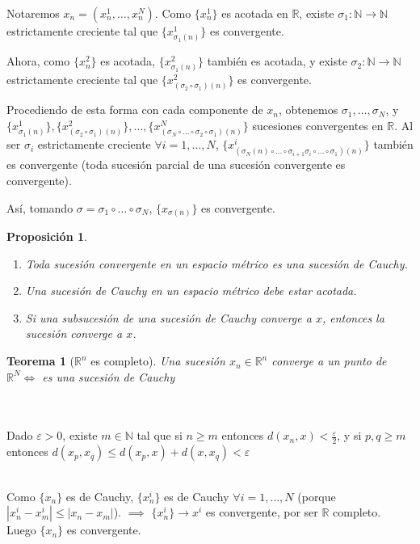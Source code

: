 \documentclass[11pt, a4paper]{article}
\makeatletter
\renewenvironment{proof}[1][\proofname] {\vspace{-15pt}\par\pushQED{\qed}\normalfont\topsep6\p@\@plus6\p@\relax\trivlist\item[\hskip\labelsep\it#1\@addpunct{.}]\ignorespaces}{\popQED\endtrivlist\@endpefalse}
\theoremstyle{theorem-style}
\newtheorem*{nth}{Teorema}
\newtheorem*{nprop}{Proposición}
\theoremstyle{definition-style}
\theoremstyle{remark-style}
\theoremstyle{example-style}
\newenvironment{nlist}
{\begin{enumerate}
\renewcommand\labelenumi{(\emph{\roman{enumi})}}}
{\end{enumerate}}
\makeatother
\begin{document}
\begin{proof}
	Notaremos $x_n = (x_n^1, \dots, x_n^N)$. Como $\{x_n^1\}$ es acotada en $\mathbb{R}$, existe $\sigma_1 : \mathbb{N} \rightarrow \mathbb{N}$ estrictamente creciente tal que $\{x_{\sigma_1(n)}^1\}$ es convergente.

Ahora, como $\{x_n^2\}$ es acotada, $\{x_{\sigma_1(n)}^2\}$ también es acotada, y existe $\sigma_2 : \mathbb{N} \rightarrow \mathbb{N}$ estrictamente creciente tal que $\{x_{(\sigma_2\circ\sigma_1)(n)}^2\}$ es convergente.

Procediendo de esta forma con cada componente de $x_n$, obtenemos $\sigma_1, \dots, \sigma_N$, y\\ $\{x_{\sigma_1(n)}^1\}, \{x_{(\sigma_2\circ\sigma_1)(n)}^2\}, \dots, \{x_{(\sigma_N\circ\dots\circ\sigma_2\circ\sigma_1)(n)}^N\}$ sucesiones convergentes en $\mathbb{R}$. Al ser $\sigma_i$ estrictamente creciente $\forall i=1,\dots,N$, $\{x_{(\sigma_N(n)\circ\dots\circ\sigma_{i+1}\sigma_i\circ\dots\circ\sigma_1)(n)}^i\}$ también es convergente (toda sucesión parcial de una sucesión convergente es convergente).

Así, tomando $\sigma = \sigma_1\circ\dots\circ\sigma_N$, $\{x_{\sigma(n)}\}$ es convergente.
\end{proof}

\begin{nprop}\hfill\\
	\begin{nlist}
	\item Toda sucesión convergente en un espacio métrico es una sucesión de Cauchy.
	\item Una sucesión de Cauchy en un espacio métrico debe estar acotada.
	\item Si una subsucesión de una sucesión de Cauchy converge a $x$, entonces la sucesión converge a $x$.
\end{nlist}
\end{nprop}

\begin{nth}[$\mathbb{R}^n$ es completo]
	Una sucesión $x_n\in \mathbb{R}^n$ converge a un punto de $\mathbb{R}^N \iff $ es una sucesión de Cauchy
\end{nth}
\begin{proof}\hfill\\
\boxed{\Leftarrow}\\
Dado $\varepsilon > 0$, existe $m\in \mathbb{N}$ tal que si $n \ge m$ entonces $d(x_n, x) < \displaystyle\frac{\varepsilon}{2}$, y si $p,q \ge m$ entonces $d(x_p, x_q) \le d(x_p, x) + d(x, x_q) < \varepsilon $


	\boxed{\Rightarrow}\\
Como $\{x_n\}$ es de Cauchy, $\{x_n^i\}$ es de Cauchy $\forall i = 1,\dots,N$ (porque $|x_n^i-x_m^i| \le |x_n-x_m|$). $\implies$ $\{x_n^i\}\rightarrow x^i$ es convergente, por ser $\mathbb{R}$ completo. Luego $\{x_n\}$ es convergente.


\end{proof}
\end{document}
